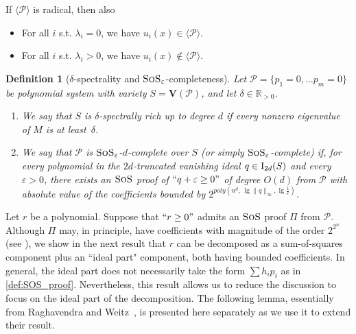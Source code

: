 \documentclass[11pt]{article}
\newcommand{\sos}{\text{\sc{SoS}}}
\newcommand{\Variety}[1]{{\textbf{V}}\left( #1 \right)}
\newcommand{\I}{\emph{$\rm{I}$}}
\newcommand{\1}{\textbf{1}}
\newtheorem{definition}[theorem]{Definition}
\begin{document}
{\begin{corol}
    If $\langle \mathcal{P} \rangle$ is radical, then also
    \begin{itemize}
        \item For all $i$ s.t. $\lambda_i = 0$, we have $u_i(x) \in \langle \mathcal{P} \rangle$.
        \item For all $i$ s.t. $\lambda_i > 0$, we have $u_i(x) \notin \langle \mathcal{P} \rangle$.
    \end{itemize}
\end{corol}
}

\begin{definition}[$\delta$-spectrality and $\sos_\varepsilon$-completeness]\label{def:delta+soscomplete}
    Let $\mathcal{P}=\{p_1=0, \dots p_m=0\}$ be polynomial system with variety $S = \Variety{\mathcal{P}}$, and let $\delta \in \mathbb{R}_{>0}$. 
    \begin{enumerate}
        \item We say that \emph{$S$ is $\delta$-spectrally rich up to degree $d$} if every nonzero eigenvalue of $M$ is at least~$\delta$.
        \item We say that \emph{$\mathcal{P}$ is $\sos_\varepsilon$-$d$-complete over $S$} (or simply $\sos_\varepsilon$-complete) if, for every polynomial in the $2d$-truncated vanishing ideal $q \in \I_{2d}(S)$ and every $\varepsilon > 0$, there exists an $\sos$ proof of $``q + \varepsilon \geq 0"$ of degree $O(d)$ from $\mathcal{P}$ with absolute value of the coefficients bounded by $2^{poly(n^d, \, \lg \| q \|_{\infty}, \lg \frac{1}{\varepsilon})}$.
    \end{enumerate}
\end{definition}

Let $r$ be a polynomial. Suppose that $``r \geq 0"$ admits an $\sos$ proof $\Pi$ from $\mathcal{P}$. Although $\Pi$ may, in principle, have coefficients with magnitude of the order $2^{2^n}$ (see \cite{odonnell2017,raghavendra_weitz2017}), we show in the next result that $r$ can be decomposed as a sum-of-squares component plus an ``ideal part" component, both having bounded coefficients. In general, the ideal part does not necessarily take the form $\sum h_i p_i$ as in \cref{def:SOS_proof}. Nevertheless, this result allows us to reduce the discussion to focus on the ideal part of the decomposition. The following lemma, essentially from Raghavendra and Weitz~\cite{raghavendra_weitz2017}, is presented here separately as we use it to extend their result.
\end{document}
